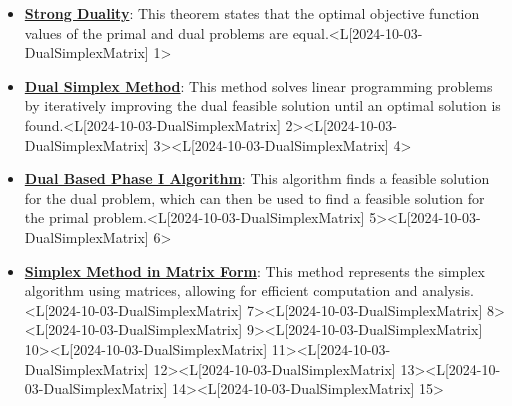 \documentclass{article}%
\begin{document}
\begin{itemize}[[leftmargin=*]]%
\item \href{https://www.math.purdue.edu/~yipn/421/2024-10-03-DualSimplexMatrix.pdf#page=1}{\textbf{Strong Duality}}: This theorem states that the optimal objective function values of the primal and dual problems are equal.<L[2024-10-03-DualSimplexMatrix] 1>%
\item \href{https://www.math.purdue.edu/~yipn/421/2024-10-03-DualSimplexMatrix.pdf#page=2}{\textbf{Dual Simplex Method}}: This method solves linear programming problems by iteratively improving the dual feasible solution until an optimal solution is found.<L[2024-10-03-DualSimplexMatrix] 2><L[2024-10-03-DualSimplexMatrix] 3><L[2024-10-03-DualSimplexMatrix] 4>%
\item \href{https://www.math.purdue.edu/~yipn/421/2024-10-03-DualSimplexMatrix.pdf#page=5}{\textbf{Dual Based Phase I Algorithm}}: This algorithm finds a feasible solution for the dual problem, which can then be used to find a feasible solution for the primal problem.<L[2024-10-03-DualSimplexMatrix] 5><L[2024-10-03-DualSimplexMatrix] 6>%
\item \href{https://www.math.purdue.edu/~yipn/421/2024-10-03-DualSimplexMatrix.pdf#page=7}{\textbf{Simplex Method in Matrix Form}}: This method represents the simplex algorithm using matrices, allowing for efficient computation and analysis.<L[2024-10-03-DualSimplexMatrix] 7><L[2024-10-03-DualSimplexMatrix] 8><L[2024-10-03-DualSimplexMatrix] 9><L[2024-10-03-DualSimplexMatrix] 10><L[2024-10-03-DualSimplexMatrix] 11><L[2024-10-03-DualSimplexMatrix] 12><L[2024-10-03-DualSimplexMatrix] 13><L[2024-10-03-DualSimplexMatrix] 14><L[2024-10-03-DualSimplexMatrix] 15>%
\end{itemize}%
\end{document}

